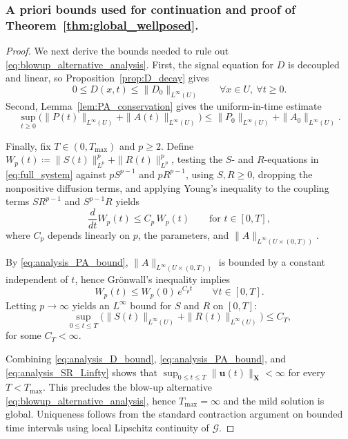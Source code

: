 \documentclass[pdflatex,sn-mathphys-ay]{sn-jnl}
\theoremstyle{thmstyleone}
\theoremstyle{definition}
\theoremstyle{remark}
\begin{document}
\subsubsection{A priori bounds used for continuation and proof of Theorem~\ref{thm:global_wellposed}.}
\begin{proof}
We next derive the bounds needed to rule out \eqref{eq:blowup_alternative_analysis}.
First, the signal equation for $D$ is decoupled and linear, so Proposition~\ref{prop:D_decay} gives
\begin{equation}
\label{eq:analysis_D_bound}
0\le D(x,t)\le \|D_0\|_{L^\infty(U)}\qquad \forall x\in U,\ \forall t\ge0.
\end{equation}
Second, Lemma~\ref{lem:PA_conservation} gives the uniform-in-time estimate
\begin{equation}
\label{eq:analysis_PA_bound}
\sup_{t\ge0}\bigl(\|P(t)\|_{L^\infty(U)}+\|A(t)\|_{L^\infty(U)}\bigr)
\le \|P_0\|_{L^\infty(U)}+\|A_0\|_{L^\infty(U)}.
\end{equation}

Finally, fix $T\in(0,T_{\max})$ and $p\ge2$. Define $W_p(t)\coloneqq \|S(t)\|_{L^p}^p+\|R(t)\|_{L^p}^p$,
testing the $S$- and $R$-equations in \eqref{eq:full_system} against $pS^{p-1}$ and $pR^{p-1}$, using $S,R\ge0$,
dropping the nonpositive diffusion terms, and applying Young's inequality to the coupling terms $SR^{p-1}$ and $S^{p-1}R$ yields
\begin{equation}
\label{eq:analysis_Wp_gronwall}
\frac{d}{dt}W_p(t)\le C_p\,W_p(t)\qquad \text{for }t\in[0,T],
\end{equation}
where $C_p$ depends linearly on $p$, the parameters, and $\|A\|_{L^\infty(U\times(0,T))}$.

By \eqref{eq:analysis_PA_bound}, $\|A\|_{L^\infty(U\times(0,T))}$ is bounded by a constant independent of $t$,
hence Gr\"onwall's inequality implies
\begin{equation}
\label{eq:analysis_Wp_bound}
W_p(t)\le W_p(0)\,e^{C_p t}\qquad \forall t\in[0,T].
\end{equation}
Letting $p\to\infty$ yields an $L^\infty$ bound for $S$ and $R$ on $[0,T]$:
\begin{equation}
\label{eq:analysis_SR_Linfty}
\sup_{0\le t\le T}\bigl(\|S(t)\|_{L^\infty(U)}+\|R(t)\|_{L^\infty(U)}\bigr)\le C_T,
\end{equation}
for some $C_T<\infty$.

Combining \eqref{eq:analysis_D_bound}, \eqref{eq:analysis_PA_bound}, and \eqref{eq:analysis_SR_Linfty} shows that
$\sup_{0\le t\le T}\|\mathbf{u}(t)\|_{\mathbf{X}}<\infty$ for every $T<T_{\max}$.
This precludes the blow-up alternative \eqref{eq:blowup_alternative_analysis}, hence $T_{\max}=\infty$ and the mild solution is global.
Uniqueness follows from the standard contraction argument on bounded time intervals using local Lipschitz continuity of $\mathcal{G}$.
\end{proof}
\end{document}
